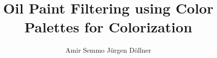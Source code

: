 \usepackage{amsmath}
\usepackage{amssymb}
\usepackage{booktabs}
\usepackage{xcolor}
\usepackage{textcomp}
\usepackage[autostyle]{csquotes}
\usepackage{wrapfig}
\usepackage{url}
\usepackage{microtype}
\usepackage{lipsum}
\usepackage{adjustbox}
\usepackage{epstopdf}



\newlength{\columnsepOriginal}
\setlength{\columnsepOriginal}{\columnsep}
\setlength{\intextsep}{0cm}

\makeatletter
\let\oldbibliography\thebibliography
\renewcommand{\thebibliography}[1]{%
  \oldbibliography{#1}%
  \setlength{\itemsep}{8pt}%
}
\makeatother

\title{Oil Paint Filtering using Color Palettes for Colorization}

\author{Amir Semmo \qquad \qquad J{\"u}rgen D{\"o}llner}





\maketitle

